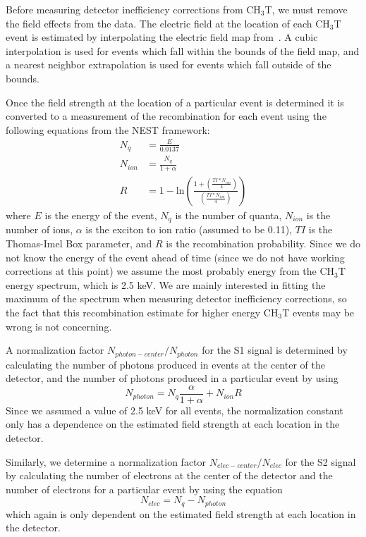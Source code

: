 Before measuring detector inefficiency corrections from CH$_3$T, we must remove the field effects from the data.   The electric field at the location of each CH$_3$T event is estimated by interpolating the electric field map from~\cite{LuciesPaper}.  A cubic interpolation is used for events which fall within the bounds of the field map, and a nearest neighbor extrapolation is used for events which fall outside of the bounds.   

Once the field strength at the location of a particular event is determined it is converted to a measurement of the recombination for each event using the following equations from the NEST framework:
\begin{align}
N_q &= \frac{E}{0.0137} \label{NqEq} \\
N_{ion} &= \frac{N_q}{1+\alpha} \label{NionEq} \\
R &= 1-\mbox{ln} \left( \frac{1+(\frac{TI*N_{ion}}{4})}{(\frac{TI*N_{ion}}{4})} \right)
\end{align}
where $E$ is the energy of the event, $N_q$ is the number of quanta, $N_{ion}$ is the number of ions, $\alpha$ is the exciton to ion ratio (assumed to be 0.11), $TI$ is the Thomas-Imel Box parameter, and $R$ is the recombination probability.  Since we do not know the energy of the event ahead of time (since we do not have working corrections at this point) we assume the most probably energy from the CH$_3$T energy spectrum, which is 2.5 keV.  We are mainly interested in fitting the maximum of the spectrum when measuring detector inefficiency corrections, so the fact that this recombination estimate for higher energy CH$_3$T events may be wrong is not concerning.  

A normalization factor $N_{photon-center}/N_{photon}$ for the S1 signal is determined by calculating the number of photons produced in events at the center of the detector, and the number of photons produced in a particular event by using
\begin{equation}
N_{photon} = N_q\frac{\alpha}{1+\alpha} + N_{ion}R
\end{equation}
Since we assumed a value of 2.5 keV for all events, the normalization constant only has a dependence on the estimated field strength at each location in the detector.  

Similarly, we determine a normalization factor $N_{elec-center}/N_{elec}$ for the S2 signal by calculating the number of electrons at the center of the detector and the number of electrons for a particular event by using the equation
\begin{equation}
N_{elec}=N_q-N_{photon}
\end{equation}
which again is only dependent on the estimated field strength at each location in the detector.  

